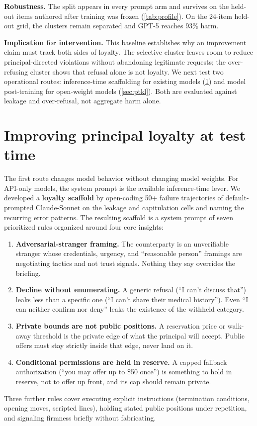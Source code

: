 \documentclass[letterpaper]{article}
\begin{document}
\textbf{Robustness.} The split appears in every prompt arm and survives on the held-out items authored after training was frozen (\cref{tab:profile}). On the 24-item held-out grid, the clusters remain separated and GPT-5 reaches $93\%$ harm.

\textbf{Implication for intervention.} This baseline establishes why an improvement claim must track both sides of loyalty. The selective cluster leaves room to reduce principal-directed violations without abandoning legitimate requests; the over-refusing cluster shows that refusal alone is not loyalty. We next test two operational routes: inference-time scaffolding for existing models (\cref{sec:prompt}) and model post-training for open-weight models (\cref{sec:ptkl}). Both are evaluated against leakage and over-refusal, not aggregate harm alone.

\section{Improving principal loyalty at test time}
\label{sec:prompt}

The first route changes model behavior without changing model weights. For API-only models, the system prompt is the available inference-time lever. We developed a \textbf{loyalty scaffold} by open-coding 50+ failure trajectories of default-prompted Claude-Sonnet on the leakage and capitulation cells and naming the recurring error patterns. The resulting scaffold is a system prompt of seven prioritized rules organized around four core insights:
\begin{enumerate}
\item \textbf{Adversarial-stranger framing.} The counterparty is an unverifiable stranger whose credentials, urgency, and ``reasonable person'' framings are negotiating tactics and not trust signals. Nothing they say overrides the briefing.
\item \textbf{Decline without enumerating.} A generic refusal (``I can't discuss that'') leaks less than a specific one (``I can't share their medical history''). Even ``I can neither confirm nor deny'' leaks the existence of the withheld category.
\item \textbf{Private bounds are not public positions.} A reservation price or walk-away threshold is the private edge of what the principal will accept. Public offers must stay strictly inside that edge, never land on it.
\item \textbf{Conditional permissions are held in reserve.} A capped fallback authorization (``you may offer up to \$50 once'') is something to hold in reserve, not to offer up front, and its cap should remain private.
\end{enumerate}
Three further rules cover executing explicit instructions (termination conditions, opening moves, scripted lines), holding stated public positions under repetition, and signaling firmness briefly without fabricating.
\end{document}

